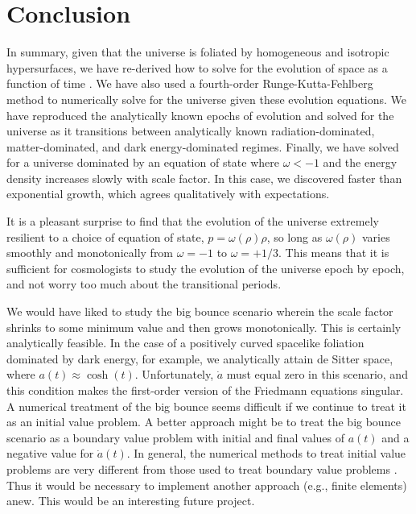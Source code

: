 \documentclass[]{article}
\begin{document}
\section{Conclusion}
\label{sec:conclusion}

In summary, given that the universe is foliated by homogeneous and
isotropic hypersurfaces, we have re-derived how to solve for the
evolution of space as a function of time
\cite{Carroll,MisnerThorneWheeler,Wald,Kempf}. We have also used a
fourth-order Runge-Kutta-Fehlberg method \cite{Fehlberg,RKF45} to
numerically solve for the universe given these evolution equations. We
have reproduced the analytically known epochs of evolution and solved
for the universe as it transitions between analytically known
radiation-dominated, matter-dominated, and dark energy-dominated
regimes. Finally, we have solved for a universe dominated by an
equation of state where $\omega<-1$ and the energy density increases
slowly with scale factor. In this case, we discovered faster than
exponential growth, which agrees qualitatively with expectations.

It is a pleasant surprise to find that the evolution of the universe
extremely resilient to a choice of equation of state,
$p=\omega(\rho)\rho$, so long as $\omega(\rho)$ varies smoothly and
monotonically from $\omega=-1$ to $\omega=+1/3$. This means that it is
sufficient for cosmologists to study the evolution of the universe
epoch by epoch, and not worry too much about the transitional periods.

We would have liked to study the big bounce scenario wherein the scale
factor shrinks to some minimum value and then grows
monotonically. This is certainly analytically feasible. In the case of
a positively curved spacelike foliation dominated by dark energy, for
example, we analytically attain de Sitter space, where $a(t)\approx
\cosh(t)$. Unfortunately, $\dot{a}$ must equal zero in this scenario,
and this condition makes the first-order version of the Friedmann
equations singular. A numerical treatment of the big bounce seems
difficult if we continue to treat it as an initial value problem. A
better approach might be to treat the big bounce scenario as a
boundary value problem with initial and final values of $a(t)$ and a
negative value for $\dot{a}(t)$. In general, the numerical methods to
treat initial value problems are very different from those used to
treat boundary value problems \cite{Heath}. Thus it would be necessary
to implement another approach (e.g., finite elements) anew. This would
be an interesting future project.



\end{document}
